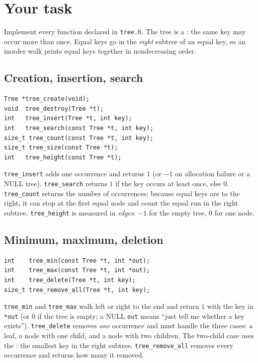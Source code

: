 \documentclass[11pt]{article}
\begin{document}
\section{Your task}

Implement every function declared in \texttt{tree.h}. The tree is a : the same key may occur more than once. Equal keys go in the \emph{right} subtree of an equal key, so an inorder walk prints equal keys together in nondecreasing order.

\subsection*{Creation, insertion, search}

\begin{verbatim}
Tree *tree_create(void);
void  tree_destroy(Tree *t);
int   tree_insert(Tree *t, int key);
int   tree_search(const Tree *t, int key);
size_t tree_count(const Tree *t, int key);
size_t tree_size(const Tree *t);
int   tree_height(const Tree *t);
\end{verbatim}

\texttt{tree\_insert} adds one occurrence and returns $1$ (or $-1$ on allocation failure or a NULL tree). \texttt{tree\_search} returns $1$ if the key occurs at least once, else $0$. \texttt{tree\_count} returns the number of occurrences; because equal keys are to the right, it can stop at the first equal node and count the equal run in the right subtree. \texttt{tree\_height} is measured in \emph{edges}: $-1$ for the empty tree, $0$ for one node.

\subsection*{Minimum, maximum, deletion}

\begin{verbatim}
int    tree_min(const Tree *t, int *out);
int    tree_max(const Tree *t, int *out);
int    tree_delete(Tree *t, int key);
size_t tree_remove_all(Tree *t, int key);
\end{verbatim}

\texttt{tree\_min} and \texttt{tree\_max} walk left or right to the end and return $1$ with the key in \texttt{*out} (or $0$ if the tree is empty; a NULL \texttt{out} means ``just tell me whether a key exists''). \texttt{tree\_delete} removes \emph{one} occurrence and must handle the three cases: a leaf, a node with one child, and a node with two children. The two-child case uses the : the smallest key in the right subtree. \texttt{tree\_remove\_all} removes every occurrence and returns how many it removed.
\end{document}
